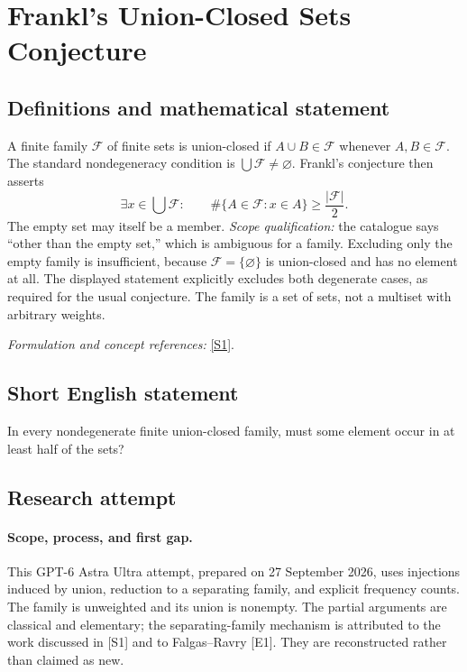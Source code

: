\documentclass[11pt]{article}
\begin{document}
\section*{\texorpdfstring{Frankl's Union-Closed Sets Conjecture}{Frankl's Union-Closed Sets Conjecture}}\label{statement}
\subsection{Definitions and mathematical statement}
A finite family $\mathcal F$ of finite sets is union-closed if $A\cup B\in\mathcal F$ whenever $A,B\in\mathcal F$. The standard nondegeneracy condition is $\bigcup\mathcal F\ne\varnothing$. Frankl's conjecture then asserts
\[
 \exists x\in\bigcup\mathcal F:\qquad
 \#\{A\in\mathcal F:x\in A\}\ge\frac{|\mathcal F|}{2}.
\]
The empty set may itself be a member. \emph{Scope qualification:} the catalogue says ``other than the empty set,'' which is ambiguous for a family. Excluding only the empty family is insufficient, because $\mathcal F=\{\varnothing\}$ is union-closed and has no element at all. The displayed statement explicitly excludes both degenerate cases, as required for the usual conjecture. The family is a set of sets, not a multiset with arbitrary weights.
\par\smallskip\textit{Formulation and concept references:} \href{https://arxiv.org/pdf/1309.3297}{[S1]}.

\subsection{Short English statement}
In every nondegenerate finite union-closed family, must some element occur in at least half of the sets?
\subsection{Research attempt}
\paragraph{Scope, process, and first gap.}
This GPT-6 Astra Ultra attempt, prepared on 27 September 2026, uses injections induced by union, reduction to a separating family, and explicit frequency counts. The family is unweighted and its union is nonempty. The partial arguments are classical and elementary; the separating-family mechanism is attributed to the work discussed in [S1] and to Falgas--Ravry [E1]. They are reconstructed rather than claimed as new.
\end{document}
